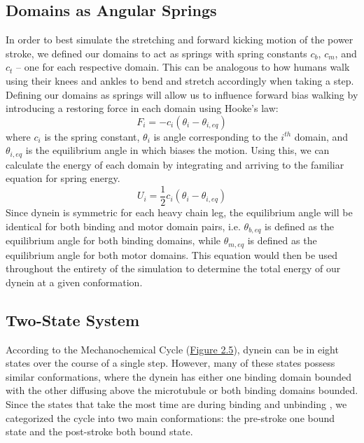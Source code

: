 \subsection{Domains as Angular Springs}
In order to best simulate the stretching and forward kicking motion of the power stroke, we defined our domains to act as springs with spring constants $c_b$, $c_m$, and $c_t$ -- one for each respective domain. This can be analogous to how humans walk using their knees and ankles to bend and stretch accordingly when taking a step. Defining our domains as springs will allow us to influence forward bias walking by introducing a restoring force in each domain using Hooke's law: 
\begin{equation}
    F_i=-c_i(\theta_i-\theta_{i,eq})
\end{equation}
where $c_i$ is the spring constant, $\theta_i$ is angle corresponding to the $i^{th}$ domain, and $\theta_{i,eq}$ is the equilibrium angle in which biases the motion. Using this, we can calculate the energy of each domain by integrating and arriving to the familiar equation for spring energy.
\begin{equation}
    U_i=\frac{1}{2}c_i(\theta_i-\theta_{i,eq})
\end{equation}
Since dynein is symmetric for each heavy chain leg, the equilibrium angle will be identical for both binding and motor domain pairs, i.e. $\theta_{b,eq}$ is defined as the equilibrium angle for both binding domains, while $\theta_{m,eq}$ is defined as the equilibrium angle for both motor domains. This equation would then be used throughout the entirety of the simulation to determine the total energy of our dynein at a given conformation. 


\subsection{Two-State System}
According to the Mechanochemical Cycle (\hyperref[fig:MechanochemicalCycle]{Figure 2.5}), dynein can be in eight states over the course of a single step. However, many of these states possess similar conformations, where the dynein has either one binding domain bounded with the other diffusing above the microtubule or both binding domains bounded. Since the states that take the most time are during binding and unbinding \cite{}, we categorized the cycle into two main conformations: the pre-stroke one bound state and the post-stroke both bound state.

